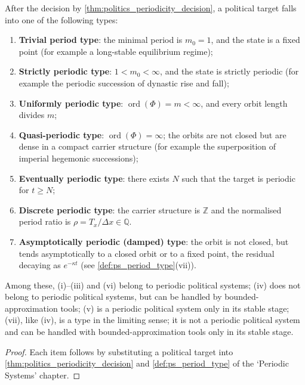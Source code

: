 \begin{corollary}\label{cor:politics_period_type}
After the decision by \cref{thm:politics_periodicity_decision}, a political target falls into one of the following types:
\begin{enumerate}[label=(\roman*)]
    \item \textbf{Trivial period type}: the minimal period is $m_0=1$, and the state is a fixed point (for example a long-stable equilibrium regime);
    \item \textbf{Strictly periodic type}: $1<m_0<\infty$, and the state is strictly periodic (for example the periodic succession of dynastic rise and fall);
    \item \textbf{Uniformly periodic type}: $\operatorname{ord}(\Phi)=m<\infty$, and every orbit length divides $m$;
    \item \textbf{Quasi-periodic type}: $\operatorname{ord}(\Phi)=\infty$; the orbits are not closed but are dense in a compact carrier structure (for example the superposition of imperial hegemonic successions);
    \item \textbf{Eventually periodic type}: there exists $N$ such that the target is periodic for $t\ge N$;
    \item \textbf{Discrete periodic type}: the carrier structure is $\mathbb Z$ and the normalised period ratio is $\rho=T_x/\Delta x\in\mathbb Q$.
    \item \textbf{Asymptotically periodic (damped) type}: the orbit is not closed, but tends asymptotically to a closed orbit or to a fixed point, the residual decaying as $e^{-\kappa t}$ (see \cref{def:ps_period_type}(vii)).
\end{enumerate}
Among these, (i)--(iii) and (vi) belong to periodic political systems; (iv) does not belong to periodic political systems, but can be handled by bounded-approximation tools; (v) is a periodic political system only in its stable stage; (vii), like (iv), is a type in the limiting sense; it is not a periodic political system and can be handled with bounded-approximation tools only in its stable stage.
\end{corollary}

\begin{proof}
Each item follows by substituting a political target into \cref{thm:politics_periodicity_decision} and \cref{def:ps_period_type} of the `Periodic Systems' chapter.
\end{proof}


